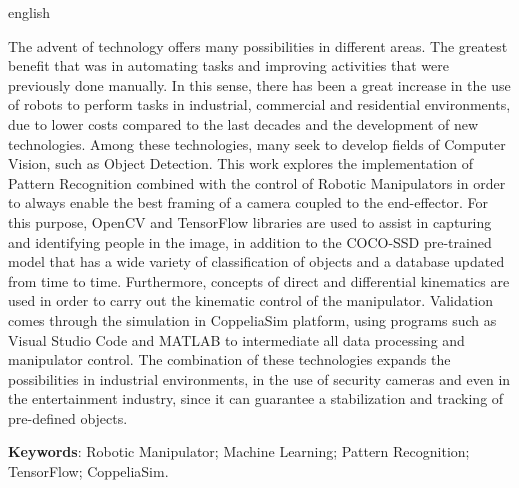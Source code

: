 
\begin{resumo}[Abstract]
 \begin{otherlanguage*}{english}

The advent of technology offers many possibilities in different areas. The greatest benefit that was in automating tasks and improving activities that were previously done manually. In this sense, there has been a great increase in the use of robots to perform tasks in industrial, commercial and residential environments, due to lower costs compared to the last decades and the development of new technologies. Among these technologies, many seek to develop fields of Computer Vision, such as Object Detection. This work explores the implementation of Pattern Recognition combined with the control of Robotic Manipulators in order to always enable the best framing of a camera coupled to the end-effector. For this purpose, OpenCV and TensorFlow libraries are used to assist in capturing and identifying people in the image, in addition to the COCO-SSD pre-trained model that has a wide variety of classification of objects and a database updated from time to time. Furthermore, concepts of direct and differential kinematics are used in order to carry out the kinematic control of the manipulator. Validation comes through the simulation in CoppeliaSim platform, using programs such as Visual Studio Code and MATLAB to intermediate all data processing and manipulator control. The combination of these technologies expands the possibilities in industrial environments, in the use of security cameras and even in the entertainment industry, since it can guarantee a stabilization and tracking of pre-defined objects.

   \vspace{\onelineskip}
 
   \noindent 
   \textbf{Keywords}: Robotic Manipulator; Machine Learning; Pattern Recognition; TensorFlow; CoppeliaSim.
 \end{otherlanguage*}
\end{resumo}